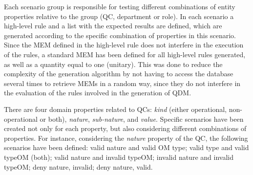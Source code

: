 \documentclass[AMA,STIX1COL,hidelinks]{WileyNJD-v2}
\begin{document}

Each scenario group is responsible for testing different combinations of entity properties relative to the group (QC, department or role). In each scenario a high-level rule and a list with the expected results are defined, which are generated according to the specific combination of properties in this scenario. Since the MEM defined in the high-level rule does not interfere in the execution of the rules, a standard MEM has been defined for all high-level rules generated, as well as a quantity equal to one (unitary). This was done to reduce the complexity of the generation algorithm by not having to access the database several times to retrieve MEMs in a random way, since they do not interfere in the evaluation of the rules involved in the generation of QDM.


There are four domain properties related to QCs:
\emph{kind} (either operational, non-operational or both),
\emph{nature}, \emph{sub-nature}, and \emph{value}. Specific scenarios have been created not only for each property, but also considering different
combinations of properties. For instance, considering the \emph{nature} property of the QC, the following scenarios have been defined: valid nature and valid OM type; valid type and valid typeOM (both); valid nature and invalid typeOM; invalid nature and invalid typeOM; deny nature, invalid; deny nature, valid.    

\end{document}
